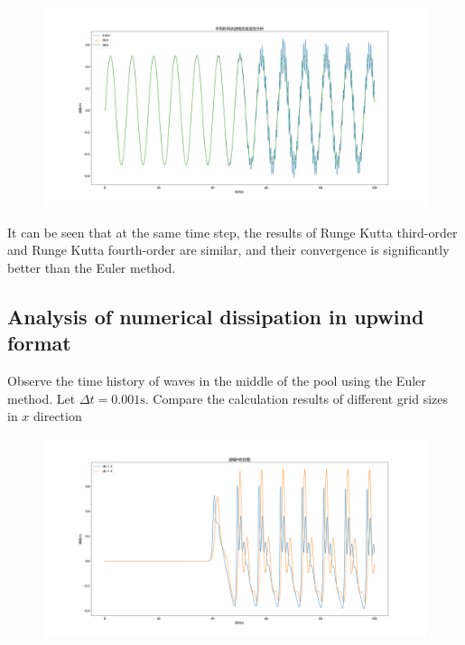 \documentclass[10pt,a4paper]{article}
\begin{document}
\begin{figure}[htbp]
	\includegraphics[width=\textwidth]{timeStep.png}
\end{figure}

It can be seen that at the same time step, the results of Runge Kutta third-order and Runge Kutta fourth-order are similar, and their convergence is significantly better than the Euler method.

\subsection{Analysis of numerical dissipation in upwind format}\label{sec3}
Observe the time history of waves in the middle of the pool using the Euler method. Let $\Delta t=0.001\mbox{s}$. Compare the calculation results of different grid sizes in $x$ direction
\begin{figure}[htbp]
	\includegraphics[width=\textwidth]{numericalDispersion.png}
\end{figure}
\end{document}
